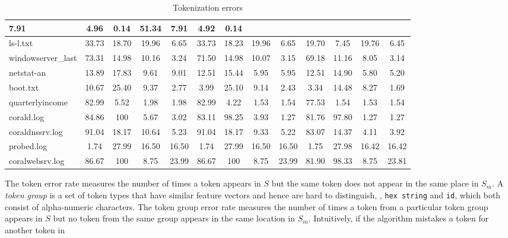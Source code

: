 \begin{table}[t]
\begin{center}
\begin{tabular}{|l||c|c|c|c||c|c|c|c||c|c|c|c|}
7.91
                     & 4.96  & 0.14  & 51.34 & 7.91     & 4.92  & 0.14  \\ \hline
ls-l.txt                   & 33.73 & 18.70 & 19.96 & 6.65  & 33.73 &
               18.23 & 19.96 & 6.65  & 19.70 & 7.45  & 19.76 & 6.45  \\ \hline
windowserver\_last     & 73.31 & 14.98 & 10.16 & 3.24  & 71.50 &
               14.98 & 10.07 & 3.15  & 69.18 & 11.16 & 8.05  & 3.14  \\ \hline
netstat-an                 & 13.89 & 17.83 & 9.61  & 9.01  & 12.51 &
               15.44 & 5.95  & 5.95  & 12.51 & 14.90 & 5.80  & 5.20  \\ \hline
boot.txt                   & 10.67 & 25.40 & 9.37  & 2.77  & 3.99 &
               25.10 & 9.14  & 2.43  & 3.34  & 14.48 & 8.27  & 1.69  \\ \hline
quarterlyincome    & 82.99 & 5.52  & 1.98  & 1.98     & 82.99 &
               4.22  & 1.53  & 1.54     & 77.53 & 1.54  & 1.53  & 1.54     \\ \hline
corald.log            & 84.86 & 100   & 5.67  & 3.02     & 83.11 &
               98.25 & 3.93  & 1.27     & 81.76 & 97.80 & 1.27  & 1.27     \\ \hline
coraldnssrv.log       & 91.04 & 18.17 & 10.64 & 5.23  & 91.04 &
               18.17 & 9.33  & 5.22  & 83.07 & 14.37 & 4.11  & 3.92  \\ \hline
probed.log            & 1.74  & 27.99 & 16.50 & 16.50 & 1.74  &
               27.99 & 16.50 & 16.50 & 1.75  & 27.98 & 16.42 & 16.42 \\ \hline
coralwebsrv.log       & 86.67 & 100   & 8.75  & 23.99 & 86.67 &
               100   & 8.75  & 23.99     & 81.90 & 98.33 & 8.75  & 23.81     \\
               \hline
\end{tabular}
\sk
\caption{Tokenization errors} \shrink 
\label{tab:error}
\end{center}
\end{table}
The token error rate measures the number of times a token appears in
$S$ but the same token does not appear in the same place in $S_m$.
A {\em token group} is a set of token types that have similar
feature vectors and hence are hard to distinguish, \eg{},
{\tt hex string} and {\tt id}, which both consist of alpha-numeric
characters. The token group error rate measures the number of times a
token from a particular token group appears in $S$ but no token from
the same group appears in the same location in $S_m$.  
Intuitively, if the algorithm mistakes a token for another token in
